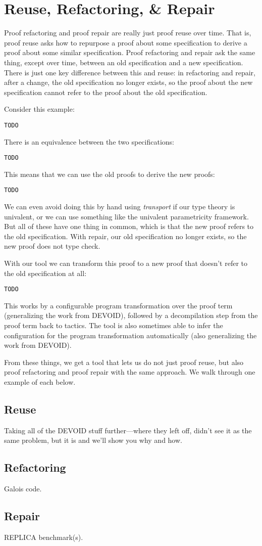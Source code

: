 \section{Reuse, Refactoring, \& Repair}

Proof refactoring and proof repair are really just proof reuse over time.
That is, proof reuse asks how to repurpose a proof about some specification
to derive a proof about some similar specification.
Proof refactoring and repair ask the same thing, except over time,
between an old specification and a new specification.
There is just one key difference between this and reuse:
in refactoring and repair, after a change,
the old specification no longer exists, so the proof about the new specification
cannot refer to the proof about the old specification.

Consider this example:

\begin{lstlisting}
TODO
\end{lstlisting}
There is an equivalence between the two specifications:

\begin{lstlisting}
TODO
\end{lstlisting}
This means that we can use the old proofs to derive the new proofs:

\begin{lstlisting}
TODO
\end{lstlisting}
We can even avoid doing this by hand using \textit{transport} if our type theory is univalent,
or we can use something like the univalent parametricity framework.
But all of these have one thing in common, which is that the new proof refers to the old specification.
With repair, our old specification no longer exists, so the new proof does not type check.

With our tool we can transform this proof to a new proof that doesn't refer to the old specification at all:

\begin{lstlisting}
TODO
\end{lstlisting}
This works by a configurable program transformation over the proof term (generalizing the work from DEVOID),
followed by a decompilation step from the proof term back to tactics.
The tool is also sometimes able to infer the configuration for the program transformation automatically (also generalizing the work from DEVOID).

From these things, we get a tool that lets us do not just proof reuse, but also proof refactoring and proof repair
with the same approach. We walk through one example of each below.

\subsection{Reuse}

Taking all of the DEVOID stuff further---where they left off, didn't see it as the same problem,
but it is and we'll show you why and how.

\subsection{Refactoring}

Galois code.

\subsection{Repair}

REPLICA benchmark(s).
